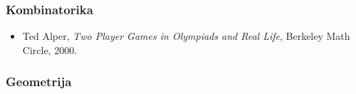 \subsubsection{Kombinatorika}
\begin{itemize}
  \item Ted Alper, \emph{Two Player Games in Olympiads and Real Life},
    Berkeley Math Circle, 2000.
\end{itemize}
\subsubsection{Geometrija}
\begin{itemize}
\end{itemize}
